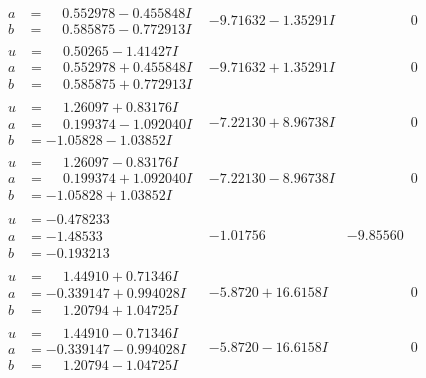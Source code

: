 \documentclass[1p]{elsarticle_modified}
\theoremstyle{definition}
\begin{document}
$$\begin{array}{c|c|c}
\begin{aligned}
a &= \phantom{-}0.552978 - 0.455848 I \\
b &= \phantom{-}0.585875 - 0.772913 I\end{aligned}
 & -9.71632 - 1.35291 I & \phantom{-0.000000 } 0 \\ \hline\begin{aligned}
u &= \phantom{-}0.50265 - 1.41427 I \\
a &= \phantom{-}0.552978 + 0.455848 I \\
b &= \phantom{-}0.585875 + 0.772913 I\end{aligned}
 & -9.71632 + 1.35291 I & \phantom{-0.000000 } 0 \\ \hline\begin{aligned}
u &= \phantom{-}1.26097 + 0.83176 I \\
a &= \phantom{-}0.199374 - 1.092040 I \\
b &= -1.05828 - 1.03852 I\end{aligned}
 & -7.22130 + 8.96738 I & \phantom{-0.000000 } 0 \\ \hline\begin{aligned}
u &= \phantom{-}1.26097 - 0.83176 I \\
a &= \phantom{-}0.199374 + 1.092040 I \\
b &= -1.05828 + 1.03852 I\end{aligned}
 & -7.22130 - 8.96738 I & \phantom{-0.000000 } 0 \\ \hline\begin{aligned}
u &= -0.478233\phantom{ +0.000000I} \\
a &= -1.48533\phantom{ +0.000000I} \\
b &= -0.193213\phantom{ +0.000000I}\end{aligned}
 & -1.01756\phantom{ +0.000000I} & -9.85560\phantom{ +0.000000I} \\ \hline\begin{aligned}
u &= \phantom{-}1.44910 + 0.71346 I \\
a &= -0.339147 + 0.994028 I \\
b &= \phantom{-}1.20794 + 1.04725 I\end{aligned}
 & -5.8720 + 16.6158 I & \phantom{-0.000000 } 0 \\ \hline\begin{aligned}
u &= \phantom{-}1.44910 - 0.71346 I \\
a &= -0.339147 - 0.994028 I \\
b &= \phantom{-}1.20794 - 1.04725 I\end{aligned}
 & -5.8720 - 16.6158 I & \phantom{-0.000000 } 0 \\ \hline\begin{aligned}

\end{aligned}
\end{array}$$
\end{document}

